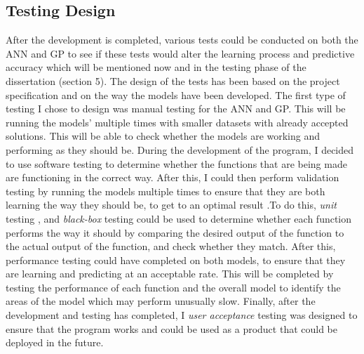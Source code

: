 \documentclass[11pt]{article}
\begin{document}
\subsection{Testing Design}\label{subsec:TD}
After the development is completed, various tests could be conducted on both the ANN and GP to see if these tests would alter the learning process and predictive accuracy which will be mentioned now and in the testing phase of the dissertation (section 5). The design of the tests has been based on the project specification and on the way the models have been developed. 
The first type of testing I chose to design was manual testing for the ANN and GP. This will be running  the models' multiple times with smaller datasets with already accepted solutions. This will be able to check whether the models are working and performing as they should be. 
During the development of the program, I decided to use software testing to determine whether the functions that are being made are functioning in the correct way. After this, I could then perform validation testing by running the models multiple times to ensure that they are both learning the way they should be, to get to an optimal result .To do this, \textit{unit} testing , and \textit{black-box} testing could be used to determine whether each function performs the way it should by comparing the desired output of the function to the actual output of the function, and check whether they match. After this, performance testing could have completed on both models, to ensure that they are learning and predicting at an acceptable rate. This will be completed by testing the performance of each function and the overall model to identify the areas of the model which may perform unusually slow. Finally, after the development and testing has completed, I \textit{user acceptance} testing was designed to ensure that the program works and could be used as a product that could be deployed in the future. 
\end{document}
